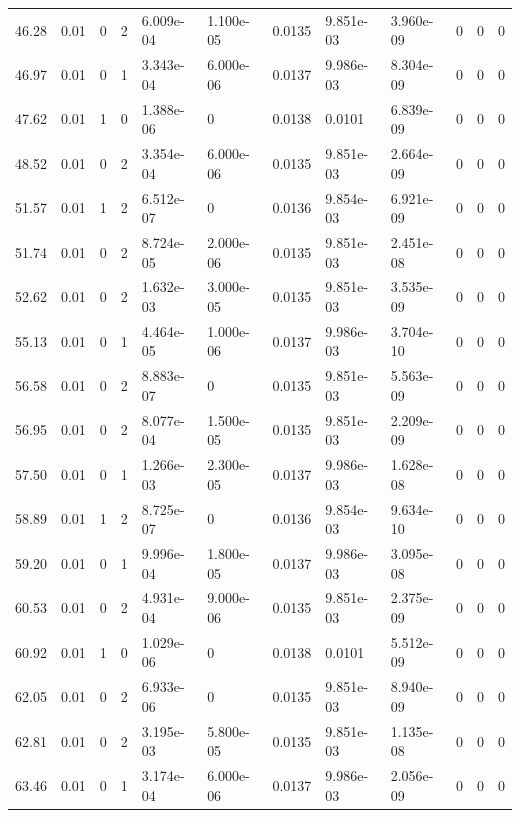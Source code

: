 \documentclass[preview]{standalone}
\begin{document}
{{{\begin{tabular}{L{1.2cm}C{1.2cm} C{0.3cm}C{0.5cm} C{1.4cm}C{1.4cm} C{1.4cm}C{1.4cm} C{1.6cm}C{1.6cm} C{1.6cm}C{1.6cm}}
  46.28  &  0.01  & 0     &  2 &  6.009e-04  & 1.100e-05  &  0.0135&   9.851e-03& 3.960e-09 & 0   &  0 & 0  \\ 
  46.97  &  0.01  & 0     &  1 &  3.343e-04  & 6.000e-06  &  0.0137&   9.986e-03& 8.304e-09 & 0   &  0 & 0  \\ 
  47.62  &  0.01  & 1     &  0 &  1.388e-06  & 0  &  0.0138&   0.0101& 6.839e-09 & 0   &  0 & 0  \\ 
  48.52  &  0.01  & 0     &  2 &  3.354e-04  & 6.000e-06  &  0.0135&   9.851e-03& 2.664e-09 & 0   &  0 & 0  \\ 
  51.57  &  0.01  & 1     &  2 &  6.512e-07  & 0  &  0.0136&   9.854e-03& 6.921e-09 & 0   &  0 & 0  \\ 
  51.74  &  0.01  & 0     &  2 &  8.724e-05  & 2.000e-06  &  0.0135&   9.851e-03& 2.451e-08 & 0   &  0 & 0  \\ 
  52.62  &  0.01  & 0     &  2 &  1.632e-03  & 3.000e-05  &  0.0135&   9.851e-03& 3.535e-09 & 0   &  0 & 0  \\ 
  55.13  &  0.01  & 0     &  1 &  4.464e-05  & 1.000e-06  &  0.0137&   9.986e-03& 3.704e-10 & 0   &  0 & 0  \\ 
  56.58  &  0.01  & 0     &  2 &  8.883e-07  & 0  &  0.0135&   9.851e-03& 5.563e-09 & 0   &  0 & 0  \\ 
  56.95  &  0.01  & 0     &  2 &  8.077e-04  & 1.500e-05  &  0.0135&   9.851e-03& 2.209e-09 & 0   &  0 & 0  \\ 
  57.50  &  0.01  & 0     &  1 &  1.266e-03  & 2.300e-05  &  0.0137&   9.986e-03& 1.628e-08 & 0   &  0 & 0  \\ 
  58.89  &  0.01  & 1     &  2 &  8.725e-07  & 0  &  0.0136&   9.854e-03& 9.634e-10 & 0   &  0 & 0  \\ 
  59.20  &  0.01  & 0     &  1 &  9.996e-04  & 1.800e-05  &  0.0137&   9.986e-03& 3.095e-08 & 0   &  0 & 0  \\ 
  60.53  &  0.01  & 0     &  2 &  4.931e-04  & 9.000e-06  &  0.0135&   9.851e-03& 2.375e-09 & 0   &  0 & 0  \\ 
  60.92  &  0.01  & 1     &  0 &  1.029e-06  & 0  &  0.0138&   0.0101& 5.512e-09 & 0   &  0 & 0  \\ 
  62.05  &  0.01  & 0     &  2 &  6.933e-06  & 0  &  0.0135&   9.851e-03& 8.940e-09 & 0   &  0 & 0  \\ 
  62.81  &  0.01  & 0     &  2 &  3.195e-03  & 5.800e-05  &  0.0135&   9.851e-03& 1.135e-08 & 0   &  0 & 0  \\ 
  63.46  &  0.01  & 0     &  1 &  3.174e-04  & 6.000e-06  &  0.0137&   9.986e-03& 2.056e-09 & 0   &  0 & 0  \\ 

\end{tabular}}}}
\end{document}
